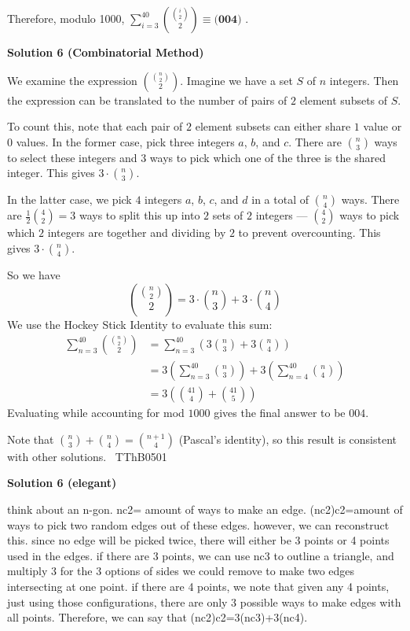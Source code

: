 \begin{enumerate}
 Therefore, modulo 1000, $\sum_{i=3}^{40} \binom{\binom{i}{2}}{2}  \equiv \boxed{\textbf{(004) }}$.

 



\textbf{Solution 6 (Combinatorial Method)}

We examine the expression $\binom{\binom{n}{2}}{2}$. Imagine we have a set $S$ of $n$ integers. Then the expression can be translated to the number of pairs of $2$ element subsets of $S$.

 To count this, note that each pair of $2$ element subsets can either share $1$ value or $0$ values. In the former case, pick three integers $a$, $b$, and $c$. There are $\binom{n}{3}$ ways to select these integers and $3$ ways to pick which one of the three is the shared integer. This gives $3\cdot \binom{n}{3}$.

 In the latter case, we pick $4$ integers $a$, $b$, $c$, and $d$ in a total of $\binom{n}{4}$ ways. There are $\frac{1}{2}\binom{4}{2} = 3$ ways to split this up into $2$ sets of $2$ integers — $\binom{4}{2}$ ways to pick which $2$ integers are together and dividing by $2$ to prevent overcounting. This gives $3\cdot \binom{n}{4}$.

 So we have 
 \[\binom{\binom{n}{2}}{2} = 3\cdot \binom{n}{3} + 3\cdot \binom{n}{4}\]We use the Hockey Stick Identity to evaluate this sum:
 \begin{align*} \sum_{n=3}^{40} \binom{\binom{n}{2}}{2} &= \sum_{n=3}^{40} \left( 3 \binom{n}{3} + 3 \binom{n}{4} \right) \\ &= 3 \left( \sum_{n=3}^{40}  \binom{n}{3} \right) + 3\left( \sum_{n=4}^{40}  \binom{n}{4} \right) \\ &= 3\left( \binom{41}{4} + \binom{41}{5} \right) \end{align*}
Evaluating while accounting for mod $1000$ gives the final answer to be $\boxed{004}$.

 
Note that $\binom{n}{3}+\binom{n}{4}=\binom{n+1}{4}$ (Pascal's identity), so this result is consistent with other solutions. ~TThB0501

 


 


 



\textbf{Solution 6 (elegant)}

think about an n-gon. nc2= amount of ways to make an edge. (nc2)c2=amount of ways to pick two random edges out of these edges. however, we can reconstruct this. since no edge will be picked twice, there will either be 3 points or 4 points used in the edges. if there are 3 points, we can use nc3 to outline a triangle, and multiply 3 for the 3 options of sides we could remove to make two edges intersecting at one point. if there are 4 points, we note that given any 4 points, just using those configurations, there are only 3 possible ways to make edges with all points. Therefore, we can say that (nc2)c2=3(nc3)+3(nc4).


\end{enumerate}
